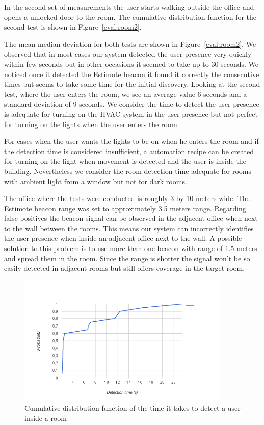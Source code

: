 In the second set of measurements the user starts walking outside the office and opens a unlocked door to the room. The cumulative distribution function for the second test is shown in Figure~\ref{eval:room2}.

The mean median deviation for both tests are shown in Figure~\ref{eval:room2}. We observed that in most cases our system detected the user presence very quickly within few seconds but in other occasions it seemed to take up to 30 seconds. We noticed once it detected the Estimote beacon it found it correctly the consecutive times but seems to take some time for the initial discovery. Looking at the second test, where the user enters the room, we see an average value 6 seconds and a standard deviation of 9 seconds. We consider the time to detect the user presence is adequate for turning on the \ac{HVAC} system in the user presence but not perfect for turning on the lights when the user enters the room.

For cases when the user wants the lights to be on when he enters the room and if the detection time is considered insufficient, a automation recipe can be created for turning on the light when movement is detected and the user is inside the building. Nevertheless we consider the room detection time adequate for rooms with ambient light from a window but not for dark rooms.

The office where the tests were conducted is roughly 3 by 10 meters wide. The Estimote beacon range was set to approximately 3.5 meters range. Regarding false positives the beacon signal can be observed in the adjacent office when next to the wall between the rooms. This means our system can incorrectly identifies the user presence when inside an adjacent office next to the wall. A possible solution to this problem is to use more than one beacon with range of 1.5 meters and spread them in the room. Since the range is shorter the signal won't be so easily detected in adjacent rooms but still offers coverage in the target room.


\begin{figure}[h]
\centering
\includegraphics[width=0.9\textwidth]{Figures/room_detection_cumulative}
\caption{Cumulative distribution function of the time it takes to detect a user inside a room}
\label{eval:room}
\end{figure}

